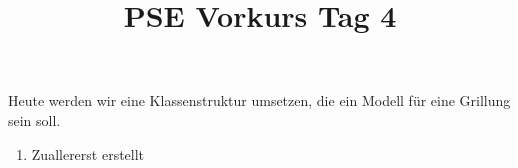 \documentclass{../../sheet}
\title{PSE Vorkurs Tag 4}
\begin{document}
\maketitle

\newpage

Heute werden wir eine Klassenstruktur umsetzen, die ein Modell für eine Grillung sein soll.

\begin{enumerate}
    \item Zuallererst erstellt 
\end{enumerate}
\end{document}

